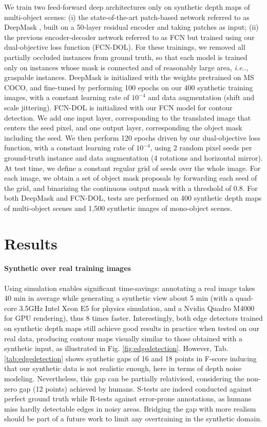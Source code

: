 \documentclass[runningheads,a4paper]{llncs}
\makeatletter
\DeclareRobustCommand\onedot{\futurelet\@let@token\@onedot}
\newcommand*\@onedot{\ifx\@let@token.\else.\null\fi\xspace}
\newcommand*\ie{\emph{i.e}\onedot} \newcommand*\Ie{\emph{I.e}\onedot}
\makeatother
\begin{document}
We train two feed-forward deep architectures only on synthetic depth maps of multi-object scenes: (i) the state-of-the-art patch-based network referred to as DeepMask \cite{SharpMask}, built on a 50-layer residual encoder \cite{HeZRS16} and taking patches as input; (ii) the previous encoder-decoder network referred to as FCN \cite{Yang2016CEDN} but trained using our dual-objective loss function (FCN-DOL). For these trainings, we removed all partially occluded instances from ground truth, so that each model is trained only on instances whose mask is connected and of reasonably large area, \ie, graspable instances. DeepMask is initialized with the weights pretrained on MS COCO, and fine-tuned by performing 100 epochs on our 400 synthetic training images, with a constant learning rate of $10^{-4}$ and data augmentation (shift and scale jittering). FCN-DOL is initialized with our FCN model for contour detection. We add one input layer, corresponding to the translated image that centers the seed pixel, and one output layer, corresponding the object mask including the seed. We then perform 120 epochs driven by our dual-objective loss function, with a constant learning rate of $10^{-4}$, using 2 random pixel seeds per ground-truth instance and data augmentation (4 rotations and horizontal mirror). At test time, we define a constant regular grid of seeds over the whole image. For each image, we obtain a set of object mask proposals by forwarding each seed of the grid, and binarizing the continuous output mask with a threshold of 0.8. For both DeepMask and FCN-DOL, tests are performed on 400 synthetic depth maps of multi-object scenes and 1,500 synthetic images of mono-object scenes.


\section{Results}
\label{sec:results}

\paragraph{Synthetic over real training images}

Using simulation enables significant time-savings: annotating a real image takes 40 min in average while generating a synthetic view about 5 min (with a quad-core 3.5GHz Intel Xeon E5 for physics simulation, and a Nvidia Quadro M4000 for GPU rendering), thus 8 times faster. Interestingly, both edge detectors trained on synthetic depth maps still achieve good results in practice when tested on our real data, producing contour maps visually similar to those obtained with a synthetic input, as illustrated in Fig. \ref{fig:edgedetection}. However, Tab. \ref{tab:edgedetection} shows synthetic gaps of 16 and 18 points in F-score inducing that our synthetic data is not realistic enough, here in terms of depth noise modeling. Nevertheless, this gap can be partially relativised, considering the non-zero gap (12 points) achieved by humans. S-tests are indeed conducted against perfect ground truth while R-tests against error-prone annotations, as humans miss hardly detectable edges in noisy areas. Bridging the gap with more realism should be part of a future work to limit any overtraining in the synthetic domain.
\end{document}
